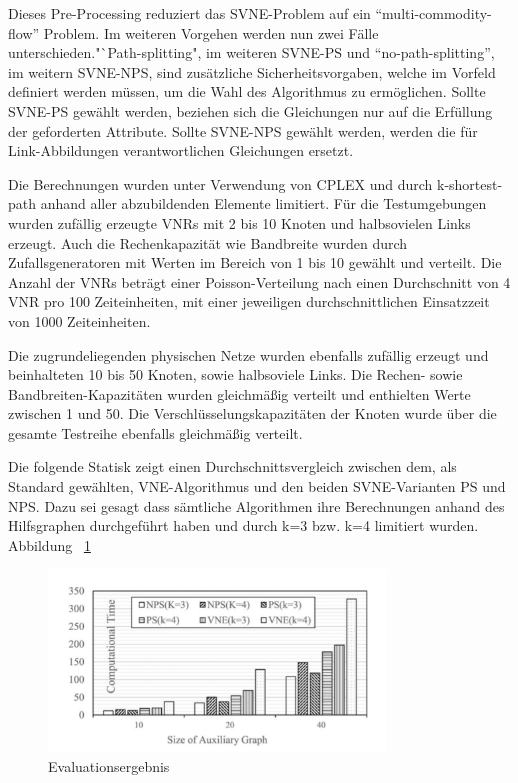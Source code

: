 \documentclass{lni}
\begin{document}
Dieses Pre-Processing reduziert das SVNE-Problem auf ein "`multi-commodity-flow"' Problem. \cite{MCF}
Im weiteren Vorgehen werden nun zwei Fälle unterschieden."`Path-splitting", im weiteren SVNE-PS und "`no-path-splitting"', im weitern SVNE-NPS, sind zusätzliche Sicherheitsvorgaben, welche im Vorfeld definiert werden müssen, um die Wahl des Algorithmus zu ermöglichen. Sollte SVNE-PS gewählt werden, beziehen sich die Gleichungen nur auf die Erfüllung der geforderten Attribute.
Sollte SVNE-NPS gewählt werden, werden die für Link-Abbildungen verantwortlichen Gleichungen ersetzt.\newline

Die Berechnungen wurden unter Verwendung von CPLEX und durch k-shortest-path anhand aller abzubildenden Elemente limitiert. \cite{CPLEX}
Für die Testumgebungen wurden zufällig erzeugte VNRs mit 2 bis 10 Knoten und halbsovielen Links erzeugt. Auch die Rechenkapazität wie Bandbreite wurden durch Zufallsgeneratoren mit Werten im Bereich von 1 bis 10 gewählt und verteilt. Die Anzahl der VNRs beträgt einer Poisson-Verteilung nach einen Durchschnitt von 4 VNR pro 100 Zeiteinheiten, mit einer jeweiligen durchschnittlichen Einsatzzeit von 1000 Zeiteinheiten.

Die zugrundeliegenden physischen Netze wurden ebenfalls zufällig erzeugt und beinhalteten 10 bis 50 Knoten, sowie halbsoviele Links. Die Rechen- sowie Bandbreiten-Kapazitäten wurden gleichmäßig verteilt und enthielten Werte zwischen 1 und 50. Die Verschlüsselungskapazitäten der Knoten  wurde über die gesamte Testreihe ebenfalls gleichmäßig verteilt.

Die folgende Statisk zeigt einen Durchschnittsvergleich zwischen dem, als Standard gewählten, VNE-Algorithmus und den beiden SVNE-Varianten PS und NPS. \cite{Std} Dazu sei gesagt dass sämtliche Algorithmen ihre Berechnungen anhand des Hilfsgraphen durchgeführt haben und durch k=3 bzw. k=4 limitiert wurden. Abbildung ~\ref{graph10} \newline

\begin{figure}[htb]
\begin{center}
	\includegraphics[width=0.8\textwidth]{statistic.pdf}\newline
	\caption{\label{graph10} Evaluationsergebnis \cite{wang2016towards}}
\end{center}
\end{figure}
\end{document}
